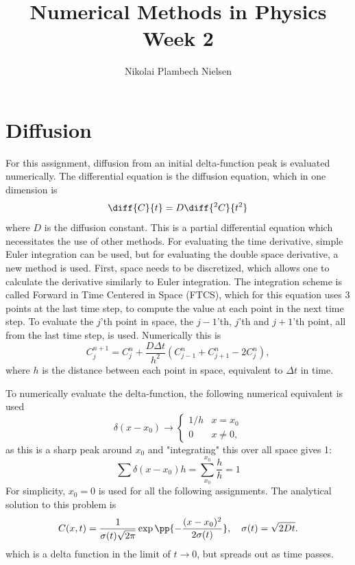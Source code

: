 \documentclass[a4paper,10pt]{article} 	%
\title{Numerical Methods in Physics Week 2}
\author{Nikolai Plambech Nielsen}
\date{}
\numberwithin{equation}{section}
\begin{document}
	\maketitle
	\section{Diffusion}
	For this assignment, diffusion from an initial delta-function peak is evaluated numerically. The differential equation is the diffusion equation, which in one dimension is
	\begin{equation}\label{key}
		\diff{C}{t} = D \diff{^2 C}{t^2}
	\end{equation}
	where $ D $ is the diffusion constant. This is a partial differential equation which necessitates the use of other methods. For evaluating the time derivative, simple Euler integration can be used, but for evaluating the double space derivative, a new method is used. First, space needs to be discretized, which allows one to calculate the derivative similarly to Euler integration. The integration scheme is called Forward in Time Centered in Space (FTCS), which for this equation uses 3 points at the last time step, to compute the value at each point in the next time step. To evaluate the $ j $'th point in space, the $ j-1 $'th, $ j $'th and $ j+1 $'th point, all from the last time step, is used. Numerically this is
	\begin{equation}
		C^{n+1}_j = C^n_j + \frac{D \Delta t}{h^2} (C^n_{j-1}+C^n_{j+1} - 2 C^n_j),
	\end{equation}
	where $ h $ is the distance between each point in space, equivalent to $ \Delta t $ in time.
	
	To numerically evaluate the delta-function, the following numerical equivalent is used
	\begin{equation}\label{key}
		\delta(x-x_0) \to \begin{cases}
		1/h & x = x_0 \\
		0 & x \neq 0,
 		\end{cases}
	\end{equation}
	as this is a sharp peak around $ x_0 $ and "integrating" this over all space gives 1:
	\begin{equation}\label{key}
		\sum \delta(x-x_0) h = \sum_{x_0}^{x_0} \frac{h}{h} = 1
	\end{equation}
	For simplicity, $ x_0 = 0 $ is used for all the following assignments. The analytical solution to this problem is
	\begin{equation}\label{key}
		C(x,t) = \frac{1}{\sigma(t) \sqrt{2\pi}} \exp\pp{-\frac{(x-x_0)^2}{2\sigma(t)}}, \quad \sigma(t) = \sqrt{2Dt}.
	\end{equation}
	which is a delta function in the limit of $ t\to 0 $, but spreads out as time passes.
	
\end{document}

